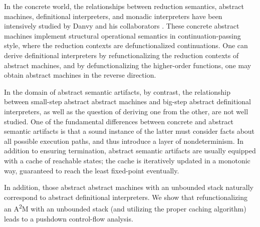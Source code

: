 \documentclass[acmsmall, screen]{acmart}\settopmatter{}
\begin{document}
In the concrete world, the relationships between reduction semantics, abstract machines,
definitional interpreters, and monadic interpreters have been intensively studied by
Danvy and his collaborators \cite{Ager:2003:FCE:888251.888254, Danvy:2001:DW:773184.773202,
danvy2004refocusing, Danvy:2008:DIP:1411204.1411206, AGER2004223, ager2005functional,
Danvy:2006:RW:2171265.2171268, danvy2009towards, biernacka2009towards}.
These concrete abstract machines implement structural operational semantics in
continuation-passing style, where the reduction contexts are defunctionalized continuations.
One can derive definitional interpreters by refunctionalizing the reduction contexts of
abstract machines, and by defunctionalizing the higher-order functions, one may obtain
abstract machines in the reverse direction.

In the domain of abstract semantic artifacts, by contrast, the relationship between small-step
abstract abstract machines and big-step abstract definitional interpreters, as well as the
question of deriving one from the other, are not well studied.
One of the fundamental differences between concrete and abstract semantic
artifacts is that a sound instance of the latter must consider facts about all possible execution
paths, and thus introduce a layer of nondeterminism. In addition to ensuring termination, abstract semantic
artifacts are usually equipped with a cache of reachable states; the cache is
iteratively updated in a monotonic way, guaranteed to reach the least fixed-point eventually.

In addition, those abstract abstract machines with an unbounded stack naturally correspond
to abstract definitional interpreters. We show that refunctionalizing an A\textsuperscript{2}M with an
unbounded stack (and utilizing the proper caching algorithm) leads to a pushdown control-flow analysis.
\end{document}
